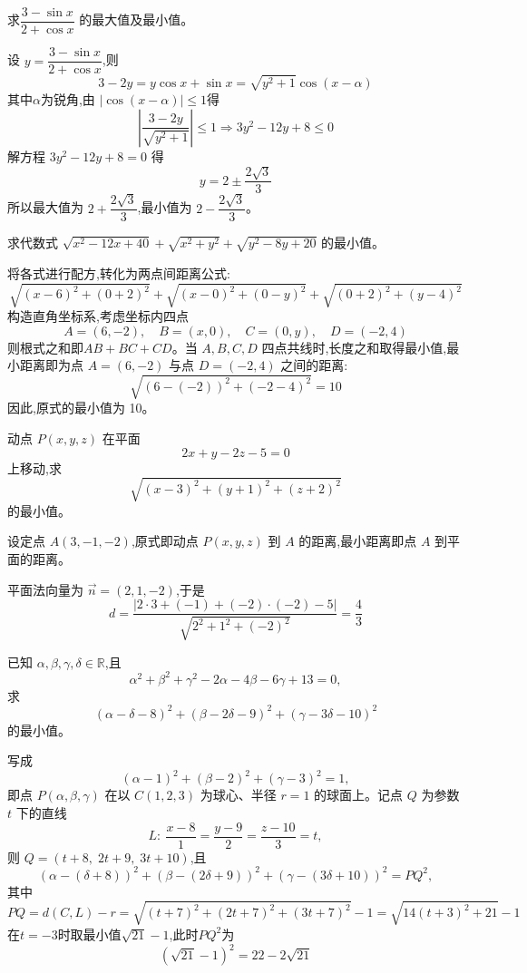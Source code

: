 \begin{questions}
    \question 求$\dfrac{3-\sin x}{2+\cos x}$ 的最大值及最小值。
    \begin{solution}
        设 $y = \dfrac{3-\sin x}{2+\cos x}$,则 
        \[
        3 - 2y = y\cos x + \sin x = \sqrt{y^2+1} \cos(x-\alpha)
        \]
        其中$\alpha$为锐角,由 $|\cos(x-\alpha)| \le 1$得 
        \[
        \left| \frac{3-2y}{\sqrt{y^2+1}} \right| \le 1 \Rightarrow 3y^2 - 12y + 8 \le 0 
        \]
        解方程 $3y^2 - 12y + 8 = 0$ 得 
        \[
        y = 2 \pm \frac{2\sqrt{3}}{3}
        \]
        所以最大值为 $2 + \dfrac{2\sqrt{3}}{3}$,最小值为 $2 - \dfrac{2\sqrt{3}}{3}$。
    \end{solution}

    \question 求代数式 $\sqrt{x^2-12x+40} + \sqrt{x^2+y^2} + \sqrt{y^2-8y+20}$ 的最小值。
    \begin{solution}
        将各式进行配方,转化为两点间距离公式:
        \[
        \sqrt{(x-6)^2 + (0 + 2)^2} + \sqrt{(x-0)^2 + (0-y)^2} + \sqrt{(0 + 2)^2 + (y-4)^2}
        \]
        构造直角坐标系,考虑坐标内四点
        \[
        A = (6, -2),\quad B = (x, 0),\quad C = (0, y),\quad D = (-2, 4)
        \]
        则根式之和即$AB+BC+CD$。当 $A, B, C, D$ 四点共线时,长度之和取得最小值,最小距离即为点 $A = (6, -2)$ 与点 $D = (-2, 4)$ 之间的距离:
        \[
        \sqrt{(6 - (-2))^2 + (-2 - 4)^2} = 10
        \]
        因此,原式的最小值为 10。
    \end{solution}

    \question 动点 $P(x,y,z)$ 在平面
    \[
    2x+y-2z-5=0
    \]
    上移动,求
    \[
    \sqrt{(x-3)^2+(y+1)^2+(z+2)^2}
    \]
    的最小值。  
    \begin{solution}
        设定点 $A(3, -1, -2)$,原式即动点 $P(x,y,z)$ 到 $A$ 的距离,最小距离即点 $A$ 到平面的距离。
        
        平面法向量为 $\vec{n} = (2, 1, -2)$,于是
        \[
        d = \frac{|2\cdot3 + (-1) + (-2)\cdot(-2) - 5|}{\sqrt{2^2 + 1^2 + (-2)^2}} = \frac{4}{3}
        \]
    \end{solution}

    \question 已知 $\alpha,\beta,\gamma,\delta\in\mathbb{R}$,且
    \[
    \alpha^2+\beta^2+\gamma^2-2\alpha-4\beta-6\gamma+13=0,
    \]
    求
    \[
    (\alpha-\delta-8)^2+(\beta-2\delta-9)^2+(\gamma-3\delta-10)^2
    \]
    的最小值。
    \begin{solution}
        写成
        \[
        (\alpha-1)^2+(\beta-2)^2+(\gamma-3)^2=1,
        \]
        即点 $P(\alpha,\beta,\gamma)$ 在以 $C(1,2,3)$ 为球心、半径 $r=1$ 的球面上。记点 $Q$ 为参数 $t$ 下的直线
        \[
        L:\ \frac{x-8}{1}=\frac{y-9}{2}=\frac{z-10}{3}=t,
        \]
        则 $Q=(t+8,\;2t+9,\;3t+10)$,且
        \[
        (\alpha-(\delta+8))^2 +(\beta-(2\delta+9))^2 +(\gamma-(3\delta+10))^2 = PQ^2,
        \]
        其中
        \[
        PQ = d(C,L) - r = \sqrt{(t+7)^2+ (2t+7)^2+ (3t+7)^2} -1 =\sqrt{14(t+3)^2+21}-1
        \]
        在$t=-3$时取最小值$\sqrt{21}-1$,此时$PQ^2$为
        \[
        (\sqrt{21}-1)^2=22-2\sqrt{21}
        \]
    \end{solution}


\end{questions}
